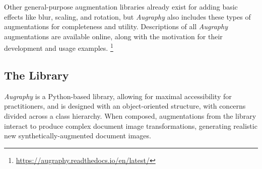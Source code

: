 \documentclass[runningheads]{llncs}
\begin{document}
\begin{table}[]
    \centering
    \caption{Individual \emph{Augraphy} augmentations for each augmentation phase, in suggested position within the pipeline. Augmentations that work well in more than one phase are listed in the last column.}
    \label{tab:augmentations}
\end{table}

Other general-purpose augmentation libraries already exist for adding basic effects like blur, scaling, and rotation, but \emph{Augraphy} also includes these types of augmentations for completeness and utility.
Descriptions of all \emph{Augraphy} augmentations are available online, along with the motivation for their development and usage examples. \footnote{\url{https://augraphy.readthedocs.io/en/latest/}}


\subsection{The Library}
\emph{Augraphy} is a Python-based library, allowing for maximal accessibility for practitioners, and is designed with an object-oriented structure, with concerns divided across a class hierarchy.
When composed, augmentations from the library interact to produce complex document image transformations, generating realistic new synthetically-augmented document images.
\end{document}
